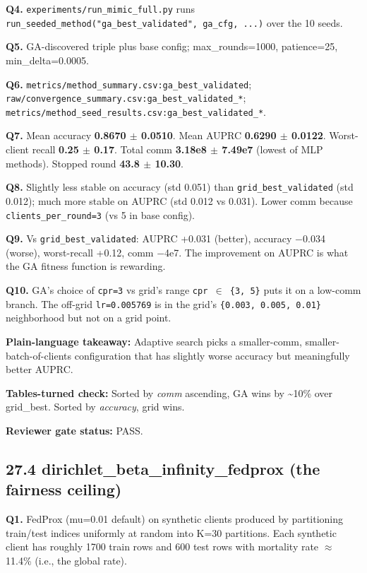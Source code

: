 \documentclass{article}
\begin{document}
\textbf{Q4.} \texttt{experiments/run\_mimic\_full.py} runs \texttt{run\_seeded\_method("ga\_best\_validated", ga\_cfg, ...)} over the 10 seeds.


\textbf{Q5.} GA-discovered triple plus base config; max\_rounds=1000, patience=25, min\_delta=0.0005.


\textbf{Q6.} \texttt{metrics/method\_summary.csv:ga\_best\_validated}; \texttt{raw/convergence\_summary.csv:ga\_best\_validated\_*}; \texttt{metrics/method\_seed\_results.csv:ga\_best\_validated\_*}.


\textbf{Q7.} Mean accuracy \textbf{0.8670 \ensuremath{\pm} 0.0510}. Mean AUPRC \textbf{0.6290 \ensuremath{\pm} 0.0122}. Worst-client recall \textbf{0.25 \ensuremath{\pm} 0.17}. Total comm \textbf{3.18e8 \ensuremath{\pm} 7.49e7} (lowest of MLP methods). Stopped round \textbf{43.8 \ensuremath{\pm} 10.30}.


\textbf{Q8.} Slightly less stable on accuracy (std 0.051) than \texttt{grid\_best\_validated} (std 0.012); much more stable on AUPRC (std 0.012 vs 0.031). Lower comm because \texttt{clients\_per\_round=3} (vs 5 in base config).


\textbf{Q9.} Vs \texttt{grid\_best\_validated}: AUPRC +0.031 (better), accuracy \ensuremath{-}0.034 (worse), worst-recall +0.12, comm \ensuremath{-}4e7. The improvement on AUPRC is what the GA fitness function is rewarding.


\textbf{Q10.} GA's choice of \texttt{cpr=3} vs grid's range \texttt{cpr \ensuremath{\in} \{3, 5\}} puts it on a low-comm branch. The off-grid \texttt{lr=0.005769} is in the grid's \texttt{\{0.003, 0.005, 0.01\}} neighborhood but not on a grid point.


\textbf{Plain-language takeaway:} Adaptive search picks a smaller-comm, smaller-batch-of-clients configuration that has slightly worse accuracy but meaningfully better AUPRC.


\textbf{Tables-turned check:} Sorted by \emph{comm} ascending, GA wins by \textasciitilde{}10\% over grid\_best. Sorted by \emph{accuracy}, grid wins.


\textbf{Reviewer gate status:} PASS.


\subsection{27.4 dirichlet\_beta\_infinity\_fedprox (the fairness ceiling)}


\textbf{Q1.} FedProx (mu=0.01 default) on synthetic clients produced by partitioning train/test indices uniformly at random into K=30 partitions. Each synthetic client has roughly 1700 train rows and 600 test rows with mortality rate \ensuremath{\approx} 11.4\% (i.e., the global rate).
\end{document}
